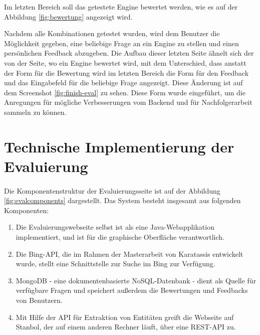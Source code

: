 Im letzten Bereich soll das getestete Engine bewertet werden, wie es auf der Abbildung \ref{fig:bewertung} angezeigt wird.

Nachdem alle Kombinationen getestet wurden, wird dem Benutzer die Möglichkeit gegeben, eine beliebige Frage an ein Engine zu stellen und einen persönlichen Feedback abzugeben. Die Aufbau dieser letzten Seite ähnelt sich der von der Seite, wo ein Engine bewertet wird, mit dem Unterschied, dass anstatt der Form für die Bewertung wird im letzten Bereich die Form für den Feedback und das Eingabefeld für die beliebige Frage angezeigt. Diese Änderung ist auf dem Screenshot \ref{fig:finish-eval} zu sehen. Diese Form wurde eingeführt, um die Anregungen für mögliche Verbesserungen vom Backend und für Nachfolgerarbeit sammeln zu können.

\section{Technische Implementierung der Evaluierung}
\paragraph{}
Die Komponentenstruktur der Evaluierungsseite ist auf der Abbildung \ref{fig:evalcomponents} dargestellt. Das System besteht insgesamt aus folgenden Komponenten:
\begin{enumerate}
\item Die Evaluierungswebseite selbst ist als eine Java-Webapplikation implementiert, und ist für die graphische Oberfläche verantwortlich.
\item Die Bing-API, die im Rahmen der Masterarbeit von Karatassis\cite{Karatassis:15} entwickelt wurde, stellt eine Schnittstelle zur Suche im Bing zur Verfügung.
\item MongoDB - eine dokumentenbasierte NoSQL-Datenbank - dient als Quelle für verfügbare Fragen und speichert außerdem die Bewertungen und Feedbacks von Benutzern.
\item Mit Hilfe der API für Extraktion von Entitäten greift die Webseite auf Stanbol, der auf einem anderen Rechner läuft, über eine REST-API zu. 
\end{enumerate}

